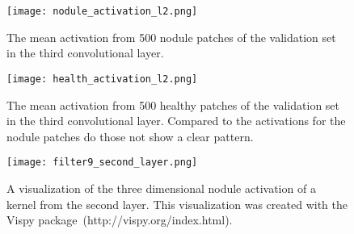 \documentclass[main.tex]{subfiles}
\begin{document}
\begin{figure}
\begin{center}
\texttt{[image: nodule\_activation\_l2.png]}
\end{center}
\caption{The mean activation from 500 nodule patches of the validation set in the third convolutional layer.}
\label{fig:mean_activation_l2}
\end{figure}

\begin{figure}
\begin{center}
\texttt{[image: health\_activation\_l2.png]}
\end{center}
\caption{The mean activation from 500 healthy patches of the validation set in the third convolutional layer. Compared to the activations for the nodule patches do those not show a clear pattern.}
\label{fig:mean_activation_l2_health}
\end{figure}


\begin{figure}
\begin{center}
\texttt{[image: filter9\_second\_layer.png]}
\end{center}
\caption{A visualization of the three dimensional nodule activation of a kernel from the second layer. This visualization was created with the Vispy package~(http://vispy.org/index.html).}
\label{fig:3d_activation}
\end{figure}
\end{document}
